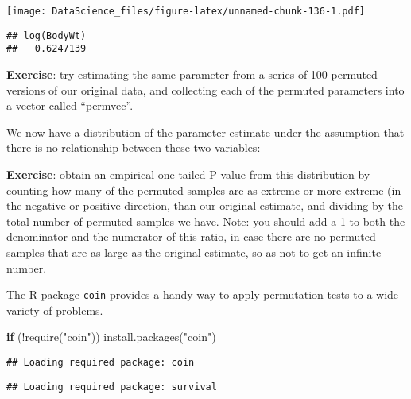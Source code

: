 \documentclass[
]{book}
\newenvironment{Shaded}{\begin{snugshade}}{\end{snugshade}}
\newcommand{\AttributeTok}[1]{\textcolor[rgb]{0.77,0.63,0.00}{#1}}
\newcommand{\ControlFlowTok}[1]{\textcolor[rgb]{0.13,0.29,0.53}{\textbf{#1}}}
\newcommand{\DecValTok}[1]{\textcolor[rgb]{0.00,0.00,0.81}{#1}}
\newcommand{\FunctionTok}[1]{\textcolor[rgb]{0.00,0.00,0.00}{#1}}
\newcommand{\NormalTok}[1]{#1}
\newcommand{\OtherTok}[1]{\textcolor[rgb]{0.56,0.35,0.01}{#1}}
\newcommand{\SpecialCharTok}[1]{\textcolor[rgb]{0.00,0.00,0.00}{#1}}
\newcommand{\StringTok}[1]{\textcolor[rgb]{0.31,0.60,0.02}{#1}}
\begin{document}
\texttt{[image: DataScience\_files/figure-latex/unnamed-chunk-136-1.pdf]}

\begin{Shaded}
\end{Shaded}

\begin{verbatim}
## log(BodyWt) 
##   0.6247139
\end{verbatim}

\textbf{Exercise}: try estimating the same parameter from a series of 100 permuted versions of our original data, and collecting each of the permuted parameters into a vector called ``permvec''.

We now have a distribution of the parameter estimate under the assumption that there is no relationship between these two variables:

\textbf{Exercise}: obtain an empirical one-tailed P-value from this distribution by counting how many of the permuted samples are as extreme or more extreme (in the negative or positive direction, than our original estimate, and dividing by the total number of permuted samples we have. Note: you should add a 1 to both the denominator and the numerator of this ratio, in case there are no permuted samples that are as large as the original estimate, so as not to get an infinite number.

The R package \texttt{coin} provides a handy way to apply permutation tests to a wide variety of problems.

\begin{Shaded}
\begin{Highlighting}[]
\ControlFlowTok{if}\NormalTok{ (}\SpecialCharTok{!}\FunctionTok{require}\NormalTok{(}\StringTok{"coin"}\NormalTok{)) }\FunctionTok{install.packages}\NormalTok{(}\StringTok{"coin"}\NormalTok{)}
\end{Highlighting}
\end{Shaded}

\begin{verbatim}
## Loading required package: coin
\end{verbatim}

\begin{verbatim}
## Loading required package: survival
\end{verbatim}
\end{document}
